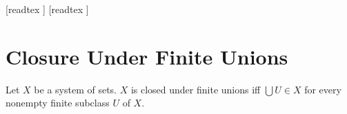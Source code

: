 \documentclass[10pt]{article}
\begin{document}
  \begin{imports}
    \begin{forthel}
      [readtex ]
      [readtex ]
    \end{forthel}
  \end{imports}


  \section*{Closure Under Finite Unions}

  \begin{forthel}
    \begin{definition}[id=FOUNDATIONS_14_7040118193913856,printid]
      Let $X$ be a system of sets.
      $X$ is closed under finite unions iff $\bigcup U \in X$ for every nonempty finite subclass $U$ of $X$.
    \end{definition}
  \end{forthel}
\end{document}
